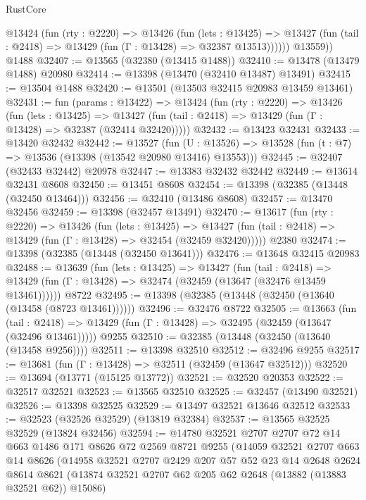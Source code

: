 \begin{lexlean}{RustCore}
\begin{coremodule}
          @13424
            (fun (rty : @2220) =>
            @13426
              (fun (lets : @13425) =>
              @13427 (fun (tail : @2418) => @13429 (fun (Γ : @13428) => @32387 @13513))))))
        @13559))
    @1488
@32407 := @13565 (@32380 (@13415 @1488))
@32410 := @13478 (@13479 @1488) @20980
@32414 := @13398 (@13470 (@32410 @13487) @13491)
@32415 := @13504 @1488
@32420 := @13501 (@13503 @32415 @20983 @13459 @13461)
@32431 := fun (params : @13422) =>
  @13424
    (fun (rty : @2220) =>
    @13426
      (fun (lets : @13425) =>
      @13427 (fun (tail : @2418) => @13429 (fun (Γ : @13428) => @32387 (@32414 @32420)))))
@32432 := @13423 @32431
@32433 := @13420 @32432
@32442 := @13527
    (fun (U : @13526) => @13528 (fun (t : @7) => @13536 (@13398 (@13542 @20980 @13416) @13553)))
@32445 := @32407 (@32433 @32442) @20978
@32447 := @13383 @32432 @32442
@32449 := @13614 @32431 @8608
@32450 := @13451 @8608
@32454 := @13398 (@32385 (@13448 (@32450 @13464)))
@32456 := @32410 (@13486 @8608)
@32457 := @13470 @32456
@32459 := @13398 (@32457 @13491)
@32470 := @13617
    (fun (rty : @2220) =>
    @13426
      (fun (lets : @13425) =>
      @13427 (fun (tail : @2418) => @13429 (fun (Γ : @13428) => @32454 (@32459 @32420)))))
    @2380
@32474 := @13398 (@32385 (@13448 (@32450 @13641)))
@32476 := @13648 @32415 @20983
@32488 := @13639
    (fun (lets : @13425) =>
    @13427
      (fun (tail : @2418) =>
      @13429 (fun (Γ : @13428) => @32474 (@32459 (@13647 (@32476 @13459 @13461))))))
    @8722
@32495 := @13398 (@32385 (@13448 (@32450 (@13640 (@13458 (@8723 @13461))))))
@32496 := @32476 @8722
@32505 := @13663
    (fun (tail : @2418) => @13429 (fun (Γ : @13428) => @32495 (@32459 (@13647 (@32496 @13461)))))
    @9255
@32510 := @32385 (@13448 (@32450 (@13640 (@13458 @9256))))
@32511 := @13398 @32510
@32512 := @32496 @9255
@32517 := @13681 (fun (Γ : @13428) => @32511 (@32459 (@13647 @32512)))
@32520 := @13694 (@13771 (@15125 @13772))
@32521 := @32520 @20353
@32522 := @32517 @32521
@32523 := @13565 @32510
@32525 := @32457 (@13490 @32521)
@32526 := @13398 @32525
@32529 := @13497 @32521 @13646 @32512
@32533 := @32523 (@32526 @32529) (@13819 @32384)
@32537 := @13565 @32525 @32529 (@13824 @32456)
@32594 := @14780
    @32521
    @2707
    @2707
    @72
    @14
    @663
    @1486
    @171
    @8626
    @72
    @2569
    @8721
    @9255
    (@14059
      @32521
      @2707
      @663
      @14
      @8626
      (@14958
        @32521
        @2707
        @2429
        @207
        @57
        @52
        @23
        @14
        @2648
        @2624
        @8614
        @8621
        (@13874 @32521 @2707 @62 @205 @62 @2648 (@13882 (@13883 @32521 @62)) @15086)

\end{coremodule}
\end{lexlean}

